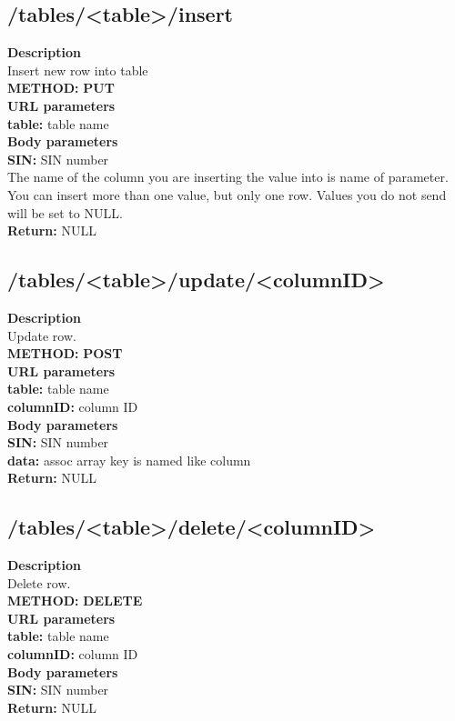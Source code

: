 \documentclass[a4paper, 12pt]{report}
\begin{document}
\subsection{/tables/<table>/insert}
\textbf{\color{redText} Description} \\
Insert new row into table\\
\textbf{\color{redText} METHOD: } \textbf{PUT} \\
\textbf{\color{redText} URL parameters} \\
\textbf{table: } table name\\
\textbf{\color{redText} Body parameters} \\
\textbf{SIN: } SIN number\\
The name of the column you are inserting the value into is name of parameter. You can insert more than one value, but only one row. Values you do not send will be set to NULL.\\
\textbf{\color{redText} Return: } NULL

\subsection{/tables/<table>/update/<columnID>}
\textbf{\color{redText} Description} \\
Update row. \\
\textbf{\color{redText} METHOD: } \textbf{POST} \\
\textbf{\color{redText} URL parameters} \\
\textbf{table: } table name\\
\textbf{columnID: } column ID\\
\textbf{\color{redText} Body parameters} \\
\textbf{SIN: } SIN number\\
\textbf{data: } assoc array key is named like column\\
\textbf{\color{redText} Return: } NULL

\subsection{/tables/<table>/delete/<columnID>}
\textbf{\color{redText} Description} \\
Delete row. \\
\textbf{\color{redText} METHOD: } \textbf{DELETE} \\
\textbf{\color{redText} URL parameters} \\
\textbf{table: } table name\\
\textbf{columnID: } column ID\\
\textbf{\color{redText} Body parameters} \\
\textbf{SIN: } SIN number\\
\textbf{\color{redText} Return: } NULL
\end{document}
